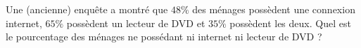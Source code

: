 
\begin{exercice}\label{exosmath-0193}

Une (ancienne) enquête a montré que \( 48\%\) des ménages possèdent une connexion internet, \( 65\%\) possèdent un lecteur de DVD et \( 35\%\) possèdent les deux. Quel est le pourcentage des ménages ne possédant ni internet ni lecteur de DVD ?

\end{exercice}
